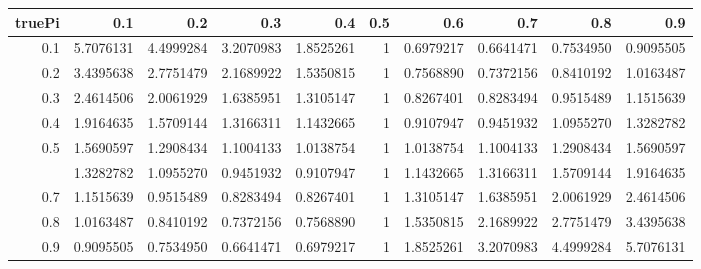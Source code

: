 
\begin{tabular}{rrrrrrrrrr}
\toprule
truePi & 0.1 & 0.2 & 0.3 & 0.4 & 0.5 & 0.6 & 0.7 & 0.8 & 0.9\\
\midrule
0.1 & 5.7076131 & 4.4999284 & 3.2070983 & 1.8525261 & 1 & 0.6979217 & 0.6641471 & 0.7534950 & 0.9095505\\
0.2 & 3.4395638 & 2.7751479 & 2.1689922 & 1.5350815 & 1 & 0.7568890 & 0.7372156 & 0.8410192 & 1.0163487\\
0.3 & 2.4614506 & 2.0061929 & 1.6385951 & 1.3105147 & 1 & 0.8267401 & 0.8283494 & 0.9515489 & 1.1515639\\
0.4 & 1.9164635 & 1.5709144 & 1.3166311 & 1.1432665 & 1 & 0.9107947 & 0.9451932 & 1.0955270 & 1.3282782\\
0.5 & 1.5690597 & 1.2908434 & 1.1004133 & 1.0138754 & 1 & 1.0138754 & 1.1004133 & 1.2908434 & 1.5690597\\
\addlinespace
0.6 & 1.3282782 & 1.0955270 & 0.9451932 & 0.9107947 & 1 & 1.1432665 & 1.3166311 & 1.5709144 & 1.9164635\\
0.7 & 1.1515639 & 0.9515489 & 0.8283494 & 0.8267401 & 1 & 1.3105147 & 1.6385951 & 2.0061929 & 2.4614506\\
0.8 & 1.0163487 & 0.8410192 & 0.7372156 & 0.7568890 & 1 & 1.5350815 & 2.1689922 & 2.7751479 & 3.4395638\\
0.9 & 0.9095505 & 0.7534950 & 0.6641471 & 0.6979217 & 1 & 1.8525261 & 3.2070983 & 4.4999284 & 5.7076131\\
\bottomrule
\end{tabular}
